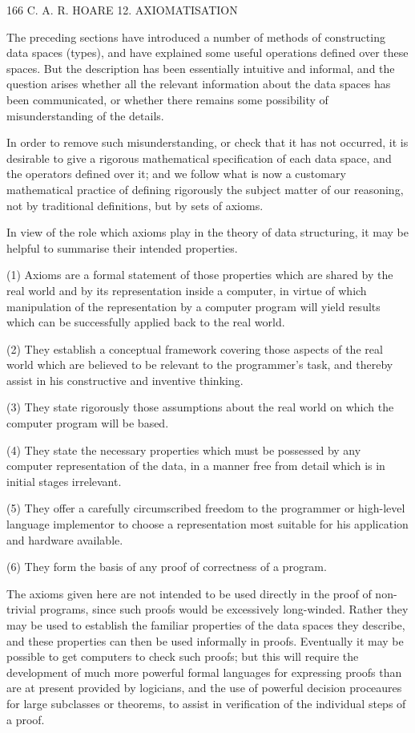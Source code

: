 166 C. A. R. HOARE 12. AXIOMATISATION

The preceding sections have introduced a number of methods of constructing data spaces (types), and have explained some useful operations defined over these spaces. But the description has been essentially intuitive and informal, and the question arises whether all the relevant information about the data spaces has been communicated, or whether there remains some possibility of misunderstanding of the details.

In order to remove such misunderstanding, or check that it has not occurred, it is desirable to give a rigorous mathematical specification of each data space, and the operators defined over it; and we follow what is now a customary mathematical practice of defining rigorously the subject matter of our reasoning, not by traditional definitions, but by sets of axioms.

In view of the role which axioms play in the theory of data structuring, it may be helpful to summarise their intended properties.

(1) Axioms are a formal statement of those properties which are shared by the real world and by its representation inside a computer, in virtue of which manipulation of the representation by a computer program will yield results which can be successfully applied back to the real world.

(2) They establish a conceptual framework covering those aspects of the real world which are believed to be relevant to the programmer’s task, and thereby assist in his constructive and inventive thinking.

(3) They state rigorously those assumptions about the real world on which the computer program will be based.

(4) They state the necessary properties which must be possessed by any computer representation of the data, in a manner free from detail which is in initial stages irrelevant.

(5) They offer a carefully circumscribed freedom to the programmer or high-level language implementor to choose a representation most suitable for his application and hardware available.

(6) They form the basis of any proof of correctness of a program.

The axioms given here are not intended to be used directly in the proof of non-trivial programs, since such proofs would be excessively long-winded. Rather they may be used to establish the familiar properties of the data spaces they describe, and these properties can then be used informally in proofs. Eventually it may be possible to get computers to check such proofs; but this will require the development of much more powerful formal languages for expressing proofs than are at present provided by logicians, and the use of powerful decision proceaures for large subclasses or theorems, to assist in verification of the individual steps of a proof.

